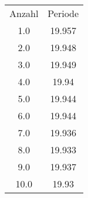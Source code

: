 \begin{table}
\begin{tabular}{cc}
Anzahl & Periode \\
1.0 & 19.957 \\
2.0 & 19.948 \\
3.0 & 19.949 \\
4.0 & 19.94 \\
5.0 & 19.944 \\
6.0 & 19.944 \\
7.0 & 19.936 \\
8.0 & 19.933 \\
9.0 & 19.937 \\
10.0 & 19.93 \\
\end{tabular}
\end{table}
